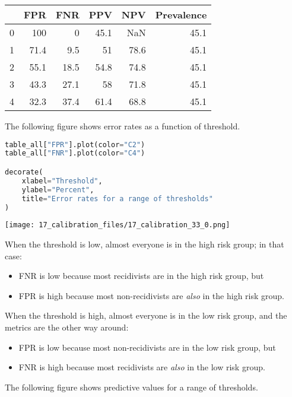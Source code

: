 \begin{tabular}{lrrrrr}
\toprule
 & FPR & FNR & PPV & NPV & Prevalence \\
\midrule
0 & 100 & 0 & 45.1 & NaN & 45.1 \\
1 & 71.4 & 9.5 & 51 & 78.6 & 45.1 \\
2 & 55.1 & 18.5 & 54.8 & 74.8 & 45.1 \\
3 & 43.3 & 27.1 & 58 & 71.8 & 45.1 \\
4 & 32.3 & 37.4 & 61.4 & 68.8 & 45.1 \\
\bottomrule
\end{tabular}

\pagebreak

The following figure shows error rates as a function of threshold.

\begin{lstlisting}[language=Python,style=source]
table_all["FPR"].plot(color="C2")
table_all["FNR"].plot(color="C4")

decorate(
    xlabel="Threshold",
    ylabel="Percent",
    title="Error rates for a range of thresholds"
)
\end{lstlisting}

\begin{center}
\texttt{[image: 17\_calibration\_files/17\_calibration\_33\_0.png]}
\end{center}

When the threshold is low, almost everyone is in the high risk group; in
that case:

\begin{itemize}
\item
  FNR is low because most recidivists are in the high risk group, but
\item
  FPR is high because most non-recidivists are \emph{also} in the high
  risk group.
\end{itemize}

When the threshold is high, almost everyone is in the low risk group,
and the metrics are the other way around:

\begin{itemize}
\item
  FPR is low because most non-recidivists are in the low risk group, but
\item
  FNR is high because most recidivists are \emph{also} in the low risk
  group.
\end{itemize}

\pagebreak

The following figure shows predictive values for a range of thresholds.

